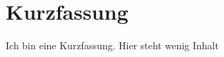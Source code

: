 \thispagestyle{empty}
\section*{Kurzfassung}
\vspace*{2em}
Ich bin eine Kurzfassung.
\newline
Hier steht wenig Inhalt